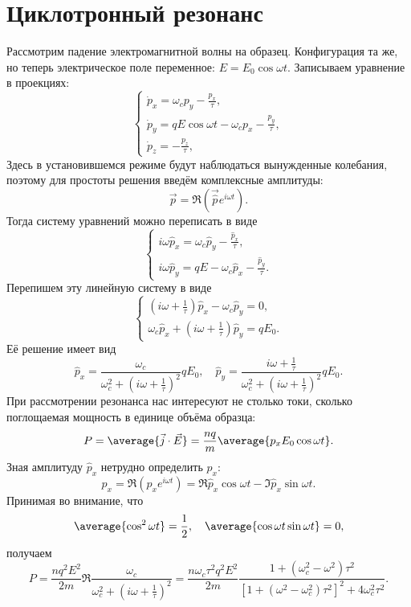 \section{Циклотронный резонанс}
    Рассмотрим падение электромагнитной волны на образец. Конфигурация та же, но
    теперь электрическое поле переменное: \( E = E_0\cos\omega t \). Записываем
    уравнение в проекциях:
    \[
        \left\{
            \begin{array}{l}
                \dot{p}_x = \omega_c p_y - \frac{p_x}{\tau}, \\
                \dot{p}_y = qE\cos\omega t - \omega_c p_x - \frac{p_y}{\tau}, \\
                \dot{p}_z = -\frac{p_z}{\tau},
            \end{array}
        \right.
    \]
    Здесь в установившемся режиме будут наблюдаться вынужденные колебания,
    поэтому для простоты решения введём комплексные амплитуды:
    \[
        \vec{p} = \Re\left(\vec{\hat{p}}e^{i\omega t}\right).
    \]
    Тогда систему уравнений можно переписать в виде
    \[
        \left\{
            \begin{array}{l}
                i\omega\hat{p}_x = \omega_c\hat{p}_y - \frac{\hat{p}_x}{\tau},\\
                i\omega\hat{p}_y = qE - \omega_c\hat{p}_x -
                    \frac{\hat{p}_y}{\tau}.
            \end{array}
        \right.
    \]
    Перепишем эту линейную систему в виде
    \[
         \left\{
            \begin{array}{l}
                (i\omega + \frac{1}{\tau})\hat{p}_x - \omega_c\hat{p}_y = 0,\\
                \omega_c\hat{p}_x + (i\omega + \frac{1}{\tau})\hat{p}_y = qE_0.
            \end{array}
        \right.
    \]
    Её решение имеет вид
    \[
        \hat{p}_x = \frac{\omega_c}{\omega_c^2 + (i\omega + \frac{1}{\tau})^2}
            qE_0, \quad
        \hat{p}_y = \frac{i\omega + \frac{1}{\tau}}
            {\omega_c^2 + (i\omega + \frac{1}{\tau})^2} qE_0.
    \]
    При рассмотрении резонанса нас интересуют не столько токи, сколько
    поглощаемая мощность в единице объёма образца:
    \[
        P = \average{\vec{j}\cdot\vec{E}} =
        \frac{nq}{m}\average{p_xE_0\cos\omega t}.
    \]
    Зная амплитуду \( \hat{p}_x \) нетрудно определить \( p_x \):
    \[
        p_x = \Re (\hat{p}_xe^{i\omega t}) = \Re\hat{p}_x \cos\omega t -
            \Im\hat{p}_x \sin\omega t.
    \]
    Принимая во внимание, что
    \[
        \average{\cos^2\omega t} = \frac{1}{2}, \quad
        \average{\cos\omega t \sin\omega t} = 0,
    \]
    получаем
    \[
        P = \frac{nq^2E^2}{2m}
        \Re\frac{\omega_c}{\omega_c^2 + (i\omega + \frac{1}{\tau})^2} =
        \frac{n\omega_c\tau^2q^2E^2}{2m}
        \frac{1 + (\omega_c^2 - \omega^2)\tau^2}
        {\left[1 + (\omega^2 - \omega_c^2)\tau^2\right]^2 +
        4\omega_c^2\tau^2}.
    \]
